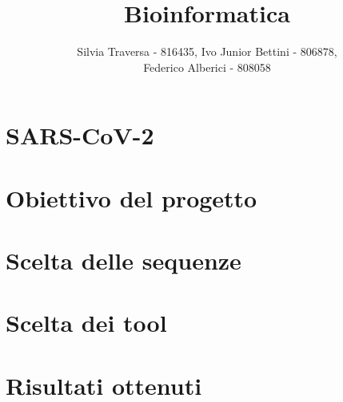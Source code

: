 \documentclass[a4paper,10pt]{article}
\title{Bioinformatica}
\author{Silvia Traversa - 816435, Ivo Junior Bettini - 806878, \\ Federico Alberici - 808058}
\date{}
\begin{document}
\maketitle 

\section*{SARS-CoV-2}

\section*{Obiettivo del progetto}

\section*{Scelta delle sequenze}

\section*{Scelta dei tool}

\section*{Risultati ottenuti}
\end{document}
